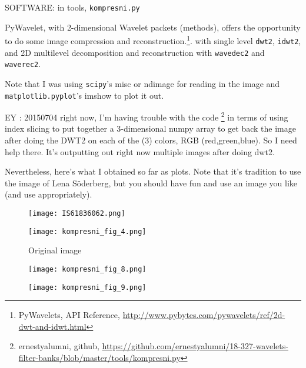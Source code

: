 \documentclass[twoside]{amsart}
\theoremstyle{plain}
\theoremstyle{definition}
\theoremstyle{remark}
\numberwithin{equation}{section}
\begin{document}
SOFTWARE: in tools, \verb|kompresni.py|

PyWavelet, with 2-dimensional Wavelet packets (methods), offers the opportunity to do some image compression and reconstruction.\footnote{PyWavelets, API Reference, \url{http://www.pybytes.com/pywavelets/ref/2d-dwt-and-idwt.html}}. with single level \verb|dwt2|, \verb|idwt2|, and 2D multilevel decomposition and reconstruction with \verb|wavedec2| and \verb|waverec2|.  

Note that I was using \verb|scipy|'s misc or ndimage for reading in the image and \verb|matplotlib.pyplot|'s imshow to plot it out.  

EY : 20150704 right now, I'm having trouble with the code \footnote{ernestyalumni, github, \url{https://github.com/ernestyalumni/18-327-wavelets-filter-banks/blob/master/tools/kompresni.py}} in terms of using index slicing to put together a 3-dimensional numpy array to get back the image after doing the DWT2 on each of the (3) colors, RGB (red,green,blue).  So I need help there.  It's outputting out right now multiple images after doing dwt2.  

Nevertheless, here's what I obtained so far as plots.  Note that it's tradition to use the image of Lena S\"{o}derberg, but you should have fun and use an image you like (and use appropriately).  

 
\begin{figure}[h!]
  \centering
  \begin{minipage}{.5\textwidth}
    \centering
    \texttt{[image: IS61836062.png]}
    \caption{Original image}
\end{minipage}%
  \begin{minipage}{.5\textwidth}
    \centering
    \texttt{[image: kompresni\_fig\_4.png]}
\end{minipage}
\end{figure}

\begin{figure}[h!]
\centering
\begin{minipage}{.5\textwidth}
  \centering
    \texttt{[image: kompresni\_fig\_8.png]}
\end{minipage}%
\begin{minipage}{.5\textwidth}
  \centering     
    \texttt{[image: kompresni\_fig\_9.png]}
\end{minipage}
\end{figure}
\end{document}
